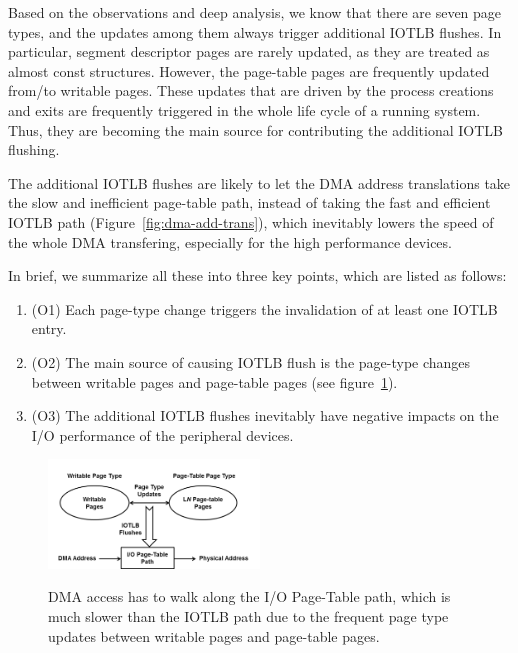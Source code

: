 Based on the observations and deep analysis, we know that there are seven page types, and the updates among them always trigger additional IOTLB flushes.
In particular, segment descriptor pages are rarely updated, as they are treated as almost const structures.
However, the page-table pages are frequently updated from/to writable pages.
These updates that are driven by the process creations and exits are frequently triggered in the whole life cycle of a running system.
Thus, they are becoming the main source for contributing the additional IOTLB flushing.

The additional IOTLB flushes are likely to let the DMA address
translations take the slow and inefficient page-table path,
instead of taking the fast and efficient IOTLB path (Figure~\ref{fig:dma-add-trans}), which inevitably lowers the
speed of the whole DMA transfering, especially for the high performance devices.


In brief, we summarize all these into three key points, which are listed as follows:
\begin{enumerate}
\item (O1) Each page-type change triggers the invalidation of at least one IOTLB entry.
\item (O2) The main source of causing IOTLB flush is the page-type changes between writable pages and page-table pages (see figure~\ref{fig:pro-ill}).
\item (O3) The additional IOTLB flushes inevitably have negative impacts on the I/O performance of the peripheral devices.
\end{enumerate}

\begin{figure}[ht]
\centering
\includegraphics[width=0.5\textwidth]{image/background/problem-illustration.png} \\
\caption{DMA access has to walk along the I/O Page-Table path, which is much slower than the IOTLB path due to the frequent page type updates between writable pages and page-table pages.}
\label{fig:pro-ill}
\end{figure}

